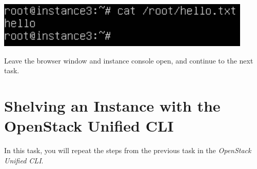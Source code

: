 \documentclass[letterpaper, 12pt]{article}
\begin{document}
\begin{enumerate}
\begin{labstep}
        \begin{center}
            \includegraphics[width=\linewidth]{images/part5/step19.png}
        \end{center}
    \end{labstep}

    \begin{labstep}
        Leave the browser window and instance console open, and continue to the next task.
    \end{labstep}
\end{enumerate}

\section{Shelving an Instance with the OpenStack Unified CLI}\label{sec:shelving_an_instance_with_the_openstack_unified_cli}
In this task, you will repeat the steps from the previous task in the \textit{OpenStack Unified CLI}.
\end{document}
